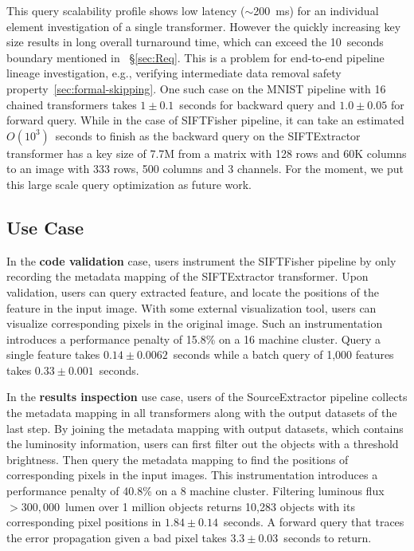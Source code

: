 \documentclass{sig-alternate}
\begin{document}
This query scalability profile shows low latency ($\sim$200~ms) for an individual element investigation of a single transformer. 
However the quickly increasing key size results in long overall turnaround time, which can exceed the 10~seconds boundary mentioned in ~\S\ref{sec:Req}. 
This is a problem for end-to-end pipeline lineage investigation, e.g., verifying intermediate data removal safety property~\ref{sec:formal-skipping}.
One such case on the MNIST pipeline with 16 chained transformers takes $1\pm0.1$~seconds for backward query and $1.0\pm 0.05$ for forward query.
While in the case of SIFTFisher pipeline,  it can take an estimated $O(10^3)$~seconds to finish as the backward query on the SIFTExtractor
transformer has a key size of 7.7M from a matrix with 128 rows and 60K columns to an image with 333 rows, 500 columns and 3 channels. 
For the moment, we put this large scale query optimization as future work.

\subsection{Use Case}
In the {\bf code validation} case, users instrument the SIFTFisher pipeline by only recording the metadata mapping of the SIFTExtractor transformer.
Upon validation, users can query extracted feature, and locate the positions of the feature in the input image. With some external visualization tool,
users can visualize corresponding pixels in the original image. Such an instrumentation introduces a performance penalty of 15.8\% on a 16 machine 
cluster.
Query a single feature takes $0.14\pm0.0062$~seconds while a batch query of 1,000 features takes $0.33\pm0.001$~seconds.

In the {\bf results inspection} use case, users of the SourceExtractor pipeline collects the metadata mapping in all transformers along with the output 
datasets of the last step. By joining the metadata mapping with output datasets, which contains the luminosity information, users can first filter out the
objects with a threshold brightness. Then query the metadata mapping to find the positions of corresponding pixels in the input images.
This instrumentation introduces a performance penalty of 40.8\% on a 8 machine cluster. 
Filtering luminous flux $>300,000$~lumen over 1 million objects returns 10,283 objects
with its corresponding pixel positions in $1.84\pm0.14$~seconds. 
A forward query that traces the error propagation given a bad pixel takes $3.3\pm0.03$~seconds to return.
\end{document}
